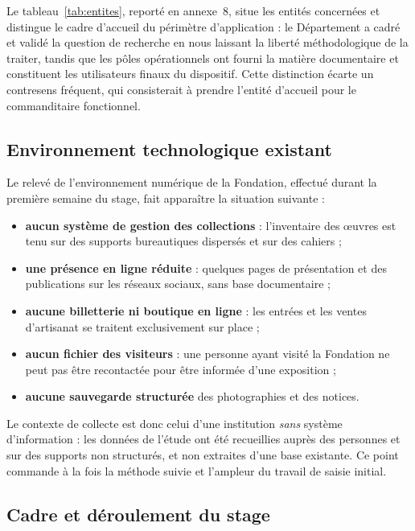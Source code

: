 Le tableau~\ref{tab:entites}, reporté en annexe~8, situe les entités concernées
et distingue le cadre d'accueil du périmètre d'application : le Département a
cadré et validé la question de recherche en nous laissant la liberté
méthodologique de la traiter, tandis que les pôles opérationnels ont fourni la
matière documentaire et constituent les utilisateurs finaux du dispositif. Cette
distinction écarte un contresens fréquent, qui consisterait à prendre l'entité
d'accueil pour le commanditaire fonctionnel.

\subsection{Environnement technologique existant}

Le relevé de l'environnement numérique de la Fondation, effectué durant la
première semaine du stage, fait apparaître la situation suivante :

\begin{itemize}
  \item \textbf{aucun système de gestion des collections} : l'inventaire des
        œuvres est tenu sur des supports bureautiques dispersés et sur des
        cahiers ;
  \item \textbf{une présence en ligne réduite} : quelques pages de présentation
        et des publications sur les réseaux sociaux, sans base documentaire ;
  \item \textbf{aucune billetterie ni boutique en ligne} : les entrées et les
        ventes d'artisanat se traitent exclusivement sur place ;
  \item \textbf{aucun fichier des visiteurs} : une personne ayant visité la
        Fondation ne peut pas être recontactée pour être informée d'une
        exposition ;
  \item \textbf{aucune sauvegarde structurée} des photographies et des notices.
\end{itemize}

Le contexte de collecte est donc celui d'une institution \emph{sans} système
d'information : les données de l'étude ont été recueillies auprès des personnes
et sur des supports non structurés, et non extraites d'une base existante. Ce
point commande à la fois la méthode suivie et l'ampleur du travail de saisie
initial.

\subsection{Cadre et déroulement du stage}
\label{sec:stage}

